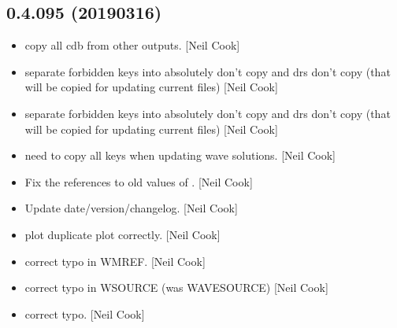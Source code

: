 \documentclass[a4paper,10pt,english]{report}
\begin{document}
\subsection{0.4.095 (2019\sphinxhyphen{}03\sphinxhyphen{}16)}
\label{\detokenize{misc/changelog:id184}}\begin{itemize}
\item {} 
 \sphinxhyphen{} copy all cdb from other outputs. {[}Neil Cook{]}

\item {} 
 \sphinxhyphen{} separate forbidden keys into absolutely don’t copy and
drs don’t copy (that will be copied for updating current files) {[}Neil
Cook{]}

\item {} 
 \sphinxhyphen{} separate forbidden keys into absolutely don’t copy and
drs don’t copy (that will be copied for updating current files) {[}Neil
Cook{]}

\item {} 
 \sphinxhyphen{} need to copy all keys when updating wave solutions.
{[}Neil Cook{]}

\item {} 
Fix the references to old values of . {[}Neil Cook{]}

\item {} 
Update date/version/changelog. {[}Neil Cook{]}

\item {} 
 \sphinxhyphen{} plot duplicate plot correctly. {[}Neil Cook{]}

\item {} 
 \sphinxhyphen{} correct typo in WMREF. {[}Neil Cook{]}

\item {} 
 \sphinxhyphen{} correct typo in WSOURCE (was WAVESOURCE)
{[}Neil Cook{]}

\item {} 
 \sphinxhyphen{} correct typo. {[}Neil Cook{]}

\end{itemize}
\end{document}
